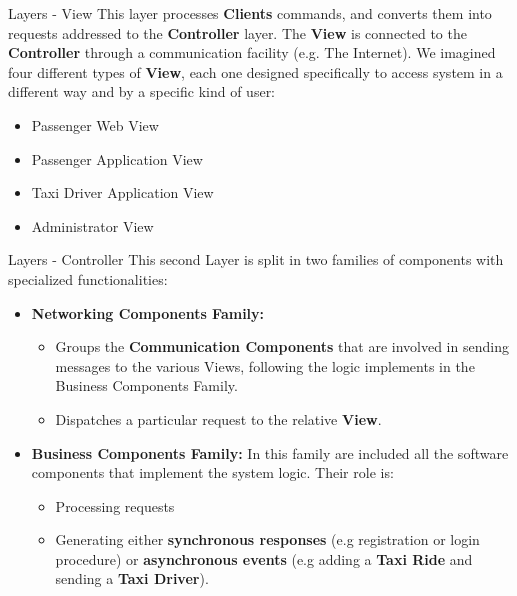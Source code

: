 \documentclass{../common/latex_classes/pdf_presentation}
\begin{document}
	\begin{frame}{Layers - View}
		This layer processes \textbf{Clients} commands, and converts them into requests addressed to the \textbf{Controller} layer.
		The \textbf{View} is connected to the \textbf{Controller} through a communication facility (e.g. The Internet).
		We imagined four different types of \textbf{View}, each one designed specifically to access \myTaxiService{} system in a different way and by a specific kind of user:
		\begin{itemize}
			\item Passenger Web View
			\item Passenger Application View
			\item Taxi Driver Application View
			\item Administrator View
		\end{itemize}
	\end{frame}
	
	\begin{frame}{Layers - Controller}
		This second Layer is split in two families of components with specialized functionalities:
		\begin{itemize}
			\item \textbf{Networking Components Family:}
			\begin{itemize}
				\item Groups the \textbf{Communication Components} that are involved in sending messages to the various Views, following the logic implements in the Business Components Family. 
				\item Dispatches a particular request to the relative \textbf{View}.
			\end{itemize}
			\item \textbf{Business Components Family:} In this family are included all the software components that implement the system logic.
			Their role is:
			\begin{itemize}
				\item Processing requests 
				\item Generating either \textbf{synchronous responses} (e.g registration or login procedure) or \textbf{asynchronous events} (e.g adding a \textbf{Taxi Ride} and sending a \textbf{Taxi Driver}).
			\end{itemize}
		\end{itemize}
	\end{frame}
	
\end{document}
